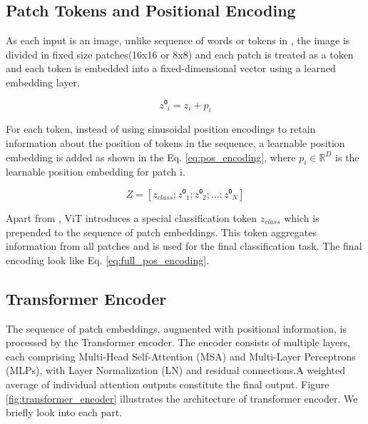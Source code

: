 \subsection{Patch Tokens and Positional Encoding}

As each input is an image, unlike sequence of words or tokens in \cite{vaswani2023attentionneed}, the image is divided in fixed size patches(16x16 or 8x8) and each patch is treated as a token and each token is embedded into a fixed-dimensional vector using a learned embedding layer.

\begin{equation}
	\label{eq:pos_encoding}
	z⁰_i = z_i + p_i
\end{equation} 

For each token, instead of using sinusoidal position encodings\cite{vaswani2023attentionneed} to retain information about the position of tokens in the sequence, a learnable position embedding is added as shown in the Eq. \ref{eq:pos_encoding}, where \(p_i \in \mathbb{R}^{D}\) is the learnable position embedding for patch i. 

\begin{equation}
	\label{eq:full_pos_encoding}
	Z = [z_{class}; z⁰_1; z⁰_2;...; z⁰_N]
\end{equation}

Apart from \cite{vaswani2023attentionneed}, ViT\cite{dosovitskiy2020image} introduces a special classification token \(z_{class}\) which is prepended to the sequence of patch embeddings. This token aggregates information from all patches and is used for the final classification task. The final encoding look like Eq. \ref{eq:full_pos_encoding}.

\subsection{Transformer Encoder}
The sequence of patch embeddings, augmented with positional information, is processed by the Transformer encoder. The encoder consists of multiple layers, each comprising Multi-Head Self-Attention (MSA) and Multi-Layer Perceptrons (MLPs), with Layer Normalization (LN) and residual connections.A weighted average\cite{weng2020transformer} of individual attention outputs constitute the final output. Figure \ref{fig:transformer_encoder} illustrates the architecture of transformer encoder. We briefly look into each part.

